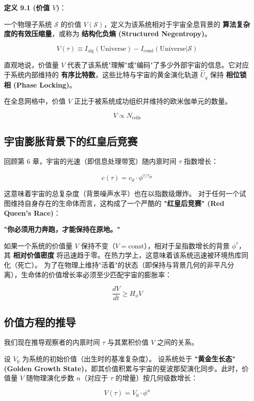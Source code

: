 \textbf{定义 9.1 (价值 $V$)}：

一个物理子系统 $\mathcal{S}$ 的价值 $V(\mathcal{S})$，定义为该系统相对于宇宙全息背景的 \textbf{算法复杂度的有效压缩量}，或称为 \textbf{结构化负熵 (Structured Negentropy)}。

\[V(\tau) \equiv I_{\text{alg}}(\text{Universe}) - I_{\text{cond}}(\text{Universe} | \mathcal{S})\]

直观地说，价值量 $V$ 代表了该系统"理解"或"编码"了多少外部宇宙的信息。它对应于系统内部维持的 \textbf{有序比特数}，这些比特与宇宙的黄金演化轨道 $\hat{U}_g$ 保持 \textbf{相位锁相 (Phase Locking)}。

在全息网格中，价值 $V$ 正比于被系统成功组织并维持的欧米伽单元的数量。

\[V \propto N_{\text{cells}}\]

\subsection{宇宙膨胀背景下的红皇后竞赛}

回顾第 6 章，宇宙的光速（即信息处理带宽）随内禀时间 $\tau$ 指数增长：

\[c(\tau) = c_0 \cdot \phi^{\tau/\tau_{pl}}\]

这意味着宇宙的总复杂度（背景噪声水平）也在以指数级爆炸。
对于任何一个试图维持自身存在的生命体而言，这构成了一个严酷的 \textbf{"红皇后竞赛" (Red Queen's Race)}：

\textbf{"你必须用力奔跑，才能保持在原地。"}

如果一个系统的价值量 $V$ 保持不变（$V = \text{const}$），相对于呈指数增长的背景 $\phi^\tau$，其 \textbf{相对价值密度} 将迅速趋于零。在热力学上，这意味着该系统迅速被环境热库同化（死亡）。
为了在物理上维持"活着"的状态（即保持与背景几何的非平凡分离），生命体的价值增长率必须至少匹配宇宙的膨胀率：

\[\frac{d V}{d t} \ge H_\phi V\]

\subsection{价值方程的推导}

我们现在推导观察者的内禀时间 $\tau$ 与其累积价值 $V$ 之间的关系。

设 $V_0$ 为系统的初始价值（出生时的基准复杂度）。
设系统处于 \textbf{"黄金生长态" (Golden Growth State)}，即其价值积累与宇宙的斐波那契演化同步。此时，价值量 $V$ 随物理演化步数 $n$（对应于 $\tau$ 的增量）按几何级数增长：

\[V(\tau) = V_0 \cdot \phi^{n}\]

